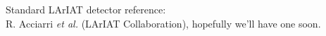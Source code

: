 \documentclass[aps,prl,twocolumn,showpacs,superscriptaddress,groupedaddress]{revtex4}  %
\begin{document}

\begin{thebibliography}{99}

    Standard LArIAT detector reference:  \\
R. Acciarri {\sl et al.} (LArIAT Collaboration),
hopefully we'll have one soon.

 \end{thebibliography}
\end{document}
